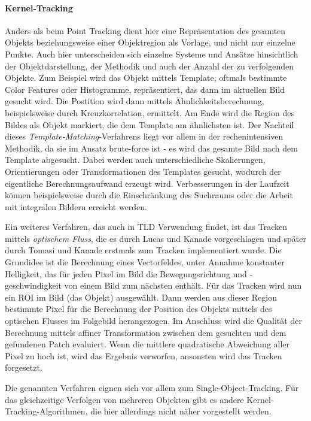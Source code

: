 \paragraph{Kernel-Tracking}
Anders als beim Point Tracking dient hier eine Repräsentation des gesamten Objekts beziehungsweise einer Objektregion als Vorlage, und nicht nur einzelne Punkte. Auch hier unterscheiden sich einzelne Systeme und Ansätze hinsichtlich der Objektdarstellung, der Methodik und auch der Anzahl der zu verfolgenden Objekte. Zum Beispiel wird das Objekt mittels Template, oftmals bestimmte Color Features oder Histogramme, repräsentiert, das dann im aktuellen Bild gesucht wird. Die Postition wird dann mittels Ähnlichkeitsberechnung, beispielsweise durch Kreuzkorrelation, ermittelt. Am Ende wird die Region des Bildes als Objekt markiert, die dem Template am ähnlichsten ist. Der Nachteil dieses \textit{Template-Matching}-Verfahrens liegt vor allem in der rechenintensiven Methodik, da sie im Ansatz brute-force ist - es wird das gesamte Bild nach dem Template abgesucht. Dabei werden auch unterschiedliche Skalierungen, Orientierungen oder Transformationen des Templates gesucht, wodurch der eigentliche Berechnungsaufwand erzeugt wird. Verbesserungen in der Laufzeit können beispielsweise durch die Einschränkung des Suchraums oder die Arbeit mit integralen Bildern\cite{INT} erreicht werden.

Ein weiteres Verfahren, das auch in TLD Verwendung findet, ist das Tracken mittels \textit{optischem Fluss}, die es durch Lucas und Kanade\cite{OPT} vorgeschlagen und später durch Tomasi und Kanade\cite{LKT} erstmals zum Tracken implementiert wurde. Die Grundidee ist die Berechnung eines Vectorfeldes, unter Annahme konstanter Helligkeit, das für jeden Pixel im Bild die Bewegungsrichtung und -geschwindigkeit von einem Bild zum nächsten enthält. Für das Tracken wird nun ein ROI im Bild (das Objekt) ausgewählt. Dann werden aus dieser Region bestimmte Pixel für die Berechnung der Position des Objekts mittels des optischen Flusses im Folgebild herangezogen. Im Anschluss wird die Qualität der Berechnung mittels affiner Transformation zwischen dem gesuchten und dem gefundenen Patch evaluiert. Wenn die mittlere quadratische Abweichung aller Pixel zu hoch ist, wird das Ergebnis verworfen, ansonsten wird das Tracken forgesetzt.

Die genannten Verfahren eignen sich vor allem zum Single-Object-Tracking. Für das gleichzeitige Verfolgen von mehreren Objekten gibt es andere Kernel-Tracking-Algorithmen, die hier allerdings nicht näher vorgestellt werden.

